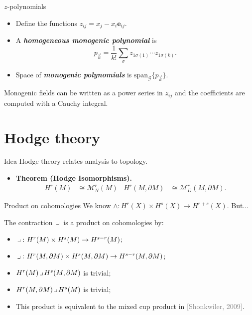 \documentclass[aspectratio=169]{beamer}
\newcommand\boldgreen[1]{\textcolor{lighter_csu_green}{\emph{\textbf{#1}}}}
\newcommand\boldgold[1]{\textcolor{csu_gold}{\textbf{#1}}}
\newcommand\grey[1]{\textcolor{gray}{#1}}
\newcommand{\G}{\mathcal{G}}
\newcommand{\monogenics}{\mathcal{M}}
\newcommand{\blade}[1]{\boldsymbol{#1}}
\newcommand{\boundary}{{\partial M}}
\newcommand{\contract}{\hspace*{.5mm} \lrcorner \hspace*{.5mm}}
\begin{document}
\begin{frame}{$z$-polynomials}
\vfill
\begin{itemize}
\pause
\item Define the functions $z_{ij}=x_j-x_i \blade{e}_{ij}$.
\pause
\item A \boldgreen{homogeneous monogenic polynomial} is
\[
p_{\vec{k}} = \frac{1}{k!} \sum_{\sigma} z_{1\sigma(1)}\cdots z_{1\sigma(k)}.
\]
\pause
\item Space of \boldgreen{monogenic polynomials} is $\mathrm{span}_\G \{p_{\vec{k}}\}$.
\end{itemize}
\pause
\begin{proposition*}{}{}
Monogenic fields can be written as a power series in $z_{ij}$ and the coefficients are computed with a Cauchy integral.
\end{proposition*}
\vfill
\end{frame}


\section{Hodge theory}

\begin{frame}{Idea}
\vfill
Hodge theory relates analysis to topology.
\begin{itemize}
  \pause
  \item \boldgold{Theorem (Hodge Isomorphisms).
  \begin{align*}
    H^r(M) &\cong \monogenics^r_N(M) & H^r(M,\boundary)&\cong \monogenics^r_D(M,\boundary).
  \end{align*}
  }
\end{itemize}
\vspace*{-0.5cm}
\begin{figure}[H]
    \centering
    \def\svgwidth{.5\columnwidth}
\resizebox{.40\textwidth}{!}{}
\end{figure}
\vfill
\end{frame}

\begin{frame}{Product on cohomologies}
\vfill
\pause
We know $\wedge \colon H^r(X) \times H^s(X) \to H^{r+s}(X)$. \pause But...
\begin{proposition*}{}{}
The contraction $\contract$ is a product on cohomologies by:
\textcolor{lighter_csu_green}{
\begin{itemize}
\item $\contract \colon H^r(M)\times H^s(M) \to H^{s-r}(M)$;
\item $\contract \colon H^r(M,\boundary)\times H^s(M,\boundary) \to H^{s-r}(M,\boundary)$;
\item $H^r(M)\contract H^s(M,\boundary)$ is trivial;
\item $H^r(M,\boundary)\contract H^s(M)$ is trivial;
\end{itemize}
}
\end{proposition*}
\pause
\begin{itemize}
  \item This product is equivalent to the mixed cup product in \grey{[Shonkwiler, 2009]}.
\end{itemize}
\vfill
\end{frame}
\end{document}
